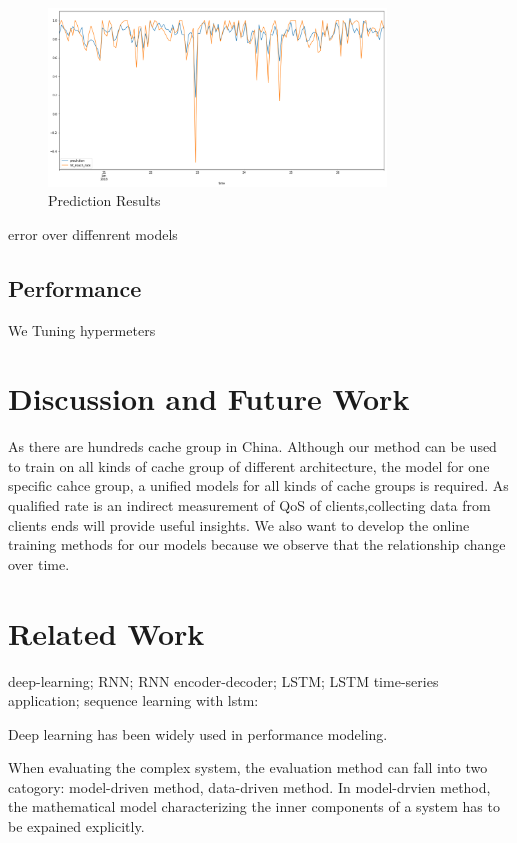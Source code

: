 \documentclass[5p]{elsarticle}
\begin{document}
\begin{figure}[h]
    \centering
    \includegraphics[width=0.8\textwidth]{result.png}
    \caption{Prediction Results}
    \label{fig:Prediction Results}
\end{figure}

error over diffenrent models

\subsection{Performance}
We Tuning hypermeters

\section{Discussion and Future Work}
As there are hundreds cache group in China. Although our method can be used to train on all kinds of cache group of different architecture, the model for one specific cahce group, a unified models for all kinds of cache groups is required. As qualified rate is an indirect measurement of QoS of clients,collecting data from clients ends will provide useful insights. We also want to develop the online training methods for our models because we observe that the relationship change over time.


\section{Related Work}
deep-learning; RNN; RNN encoder-decoder; LSTM; LSTM time-series application; sequence learning with lstm:

Deep learning has been widely used in performance modeling. 

When evaluating the complex system, the evaluation method can fall into two catogory: model-driven method, data-driven method. In model-drvien method, the mathematical model characterizing the inner components of a system has to be expained explicitly. 
\end{document}
